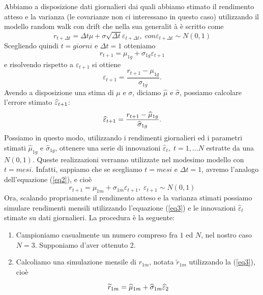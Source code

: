 \documentclass[a4paper,12pt]{article}
\begin{document}
\begin{enumerate}
\begin{enumerate}
Abbiamo a disposizione dati giornalieri dai quali abbiamo stimato il
rendimento atteso e la varianza (le covarianze non ci interessano in questo
caso) utilizzando il modello random walk con drift che nella sua generalit%
\`{a} \`{e} scritto come
\begin{equation}
r_{t+\Delta t}=\Delta t\mu +\sigma \sqrt{\Delta t}\varepsilon _{t+\Delta
t},\; con \varepsilon _{t+\Delta t}\sim N(0,1)
\end{equation}
Scegliendo quindi $t=giorni$ e $\Delta t=1$ otteniamo
\begin{equation}
r_{t+1}=\mu _{1g}+\sigma _{1g}\varepsilon _{t+1}  \label{eq2}
\end{equation}
e risolvendo rispetto a $\varepsilon _{t+1}$ si ottiene
\[
\varepsilon _{t+1}=\frac{r_{t+1}-\mu _{1g}}{\sigma _{1g}}.
\]
Avendo a disposizione una stima di $\mu $ e $\sigma $, diciamo $\widehat{\mu 
}$ e $\widehat{\sigma }$, possiamo calcolare l'errore stimato $\widehat{%
\varepsilon }_{t+1}$:
\[
\widehat{\varepsilon }_{t+1}=\frac{r_{t+1}-\widehat{\mu }_{1g}}{\widehat{%
\sigma }_{1g}}.
\]
Possiamo in questo modo, utilizzando i rendimenti giornalieri ed i parametri
stimati $\widehat{\mu }_{1g}$ e $\widehat{\sigma }_{1g}$, ottenere una serie
di innovazioni $\widehat{\varepsilon }_{t},\;t=1,\ldots N$ estratte da una $%
N(0,1)$. Queste realizzazioni verranno utilizzate nel modesimo modello con $%
t=mesi$. Infatti, sappiamo che se scegliamo $t=mesi$ e $\Delta t=1$, avremo
l'analogo dell'equazione (\ref{eq2}), e cio\`{e}
\begin{equation}
r_{t+1}=\mu _{1m}+\sigma _{1m}\varepsilon _{t+1},\;  %
\varepsilon _{t+1}\sim N(0,1)  \label{eq3}
\end{equation}
Ora, scalando propriamente il rendimento atteso e la varianza stimati
possiamo simulare rendimenti mensili utilizzando l'equazione (\ref{eq3}) e
le innovazioni $\widehat{\varepsilon }_{t}$ stimate su dati giornalieri. La
procedura \`{e} la seguente:

\begin{enumerate}
\item  Campioniamo casualmente un numero compreso fra $1$ ed $N$, nel nostro caso $N=3$.
 Supponiamo d'aver ottenuto 2.

\item  Calcoliamo una simulazione mensile di $r_{1m}$, notata $\widetilde{r}%
_{1m}$ utilizzando la  (\ref{eq3}), cio\`{e}

\[
\widetilde{r}_{1m}=\widehat{\mu }_{1m}+\widehat{\sigma }_{1m}\widehat{%
\varepsilon }_{2}
\]


\end{enumerate}
\end{enumerate}
\end{enumerate}
\end{document}
